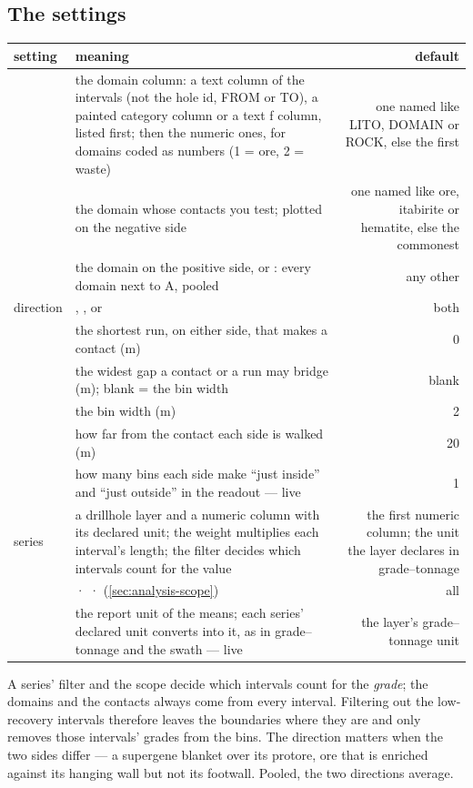 \subsection{The settings}
\begin{tabularx}{\linewidth}{@{}lMD@{}}\toprule
setting & meaning & default \\ \midrule
{} & the domain column: a text column of the intervals (not the hole id, FROM or TO), a painted category column or a text ƒ column, listed first; then the numeric ones, for domains coded as numbers (1 = ore, 2 = waste) & one named like LITO, DOMAIN or ROCK, else the first \\
 & the domain whose contacts you test; plotted on the negative side & one named like ore, itabirite or hematite, else the commonest \\
 & the domain on the positive side, or : every domain next to A, pooled & any other \\
direction & , , or  & both \\
 & the shortest run, on either side, that makes a contact (m) & 0 \\
 & the widest gap a contact or a run may bridge (m); blank = the bin width & blank \\
 & the bin width (m) & 2 \\
 & how far from the contact each side is walked (m) & 20 \\
 & how many bins each side make “just inside” and “just outside” in the readout — live & 1 \\
series & a drillhole layer and a numeric column with its declared unit; the weight multiplies each interval's length; the filter decides which intervals count for the value & the first numeric column; the unit the layer declares in grade–tonnage \\
 &  ·  ·  (\cref{sec:analysis-scope}) & all \\
 & the report unit of the means; each series' declared unit converts into it, as in grade–tonnage and the swath — live & the layer's grade–tonnage unit \\ \bottomrule
\end{tabularx}
\medskip

A series' filter and the scope decide which intervals count for the \emph{grade}; the domains and the contacts always come from every interval. Filtering out the low-recovery intervals therefore leaves the boundaries where they are and only removes those intervals' grades from the bins. The direction matters when the two sides differ — a supergene blanket over its protore, ore that is enriched against its hanging wall but not its footwall. Pooled, the two directions average.

